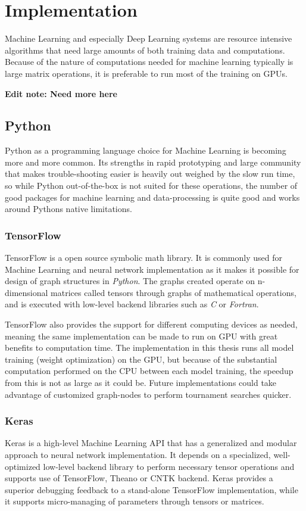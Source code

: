 \chapter{Implementation}
\label{implementation}
Machine Learning and especially Deep Learning systems are resource intensive algorithms that need large amounts of both training data and computations. Because of the nature of computations needed for machine learning typically is large matrix operations, it is preferable to run most of the training on GPUs.

\textbf{Edit note: Need more here}

\section{Python}
Python as a programming language choice for Machine Learning is becoming more and more common. Its strengths in rapid prototyping and large community that makes trouble-shooting easier is heavily out weighed by the slow run time, so while Python out-of-the-box is not suited for these operations, the number of good packages for machine learning and data-processing is quite good and works around Pythons native limitations. 

\subsection{TensorFlow}
TensorFlow\cite{tensorflow} is a open source symbolic math library. It is commonly used for Machine Learning and neural network implementation as it makes it possible for design of graph structures in \textit{Python}. The graphs created operate on n-dimensional matrices called tensors through graphs of mathematical operations, and is executed with low-level backend libraries such as \textit{C} or \textit{Fortran}.

TensorFlow also provides the support for different computing devices as needed, meaning the same implementation can be made to run on GPU with great benefits to computation time. The implementation in this thesis runs all model training (weight optimization) on the GPU, but because of the substantial computation performed on the CPU between each model training, the speedup from this is not as large as it could be. Future implementations could take advantage of customized graph-nodes to perform tournament searches quicker. 

\subsection{Keras}
Keras\cite{keras} is a high-level Machine Learning API that has a generalized and modular approach to neural network implementation. It depends on a specialized, well-optimized low-level backend library to perform necessary tensor operations and supports use of TensorFlow, Theano or CNTK backend. Keras provides a superior debugging feedback to a stand-alone TensorFlow implementation, while it supports micro-managing of parameters through tensors or matrices.

